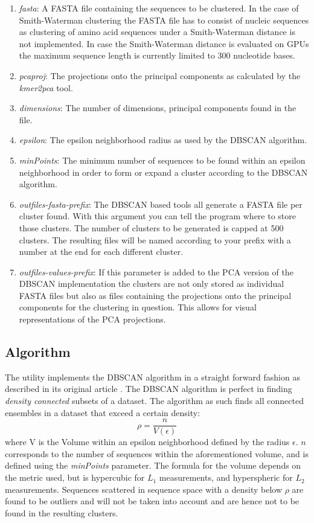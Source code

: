 \begin{enumerate}
  \item \emph{fasta}: A FASTA file containing the sequences to be
    clustered. In the case of Smith-Waterman clustering the FASTA file
    has to consist of nucleic sequences as clustering of amino acid
    sequences under a Smith-Waterman distance is not implemented. In
    case the Smith-Waterman distance is evaluated on GPUs the maximum
    sequence length is currently limited to 300 nucleotide bases.
  \item \emph{pcaproj}: The projections onto the principal components
    as calculated by the \emph{kmer2pca} tool. 
  \item \emph{dimensions}: The number of dimensions, principal
    components found in the file.
  \item \emph{epsilon}: The epsilon neighborhood radius as used by the DBSCAN
    \cite{dbscan} algorithm.
  \item \emph{minPoints}: The minimum number of sequences to be found
    within an epsilon neighborhood in order to form or expand a
    cluster according to the DBSCAN algorithm.
  \item \emph{outfiles-fasta-prefix}: The DBSCAN based tools all
    generate a FASTA file per cluster found. With this argument you
    can tell the program where to store those clusters. The number of
    clusters to be generated is capped at 500 clusters. The resulting
    files will be named according to your prefix with a number at the
    end for each different cluster.
  \item \emph{outfiles-values-prefix}: If this parameter is added to
    the PCA version of the DBSCAN implementation the clusters are not
    only stored as individual FASTA files but also as files containing
    the projections onto the principal components for the clustering
    in question. This allows for visual representations of the PCA projections.
\end{enumerate}

\subsection{Algorithm} \label{sec-dbscan-algorithm}

The utility implements the DBSCAN algorithm in a straight forward
fashion as
described in its original article \cite{dbscan}. The DBSCAN algorithm
is perfect in finding \emph{density connected} subsets of a
dataset. The algorithm as such finds all connected ensembles in a
dataset that exceed a certain density:
\begin{equation}
  \rho = \frac{n}{V(\epsilon)} \label{eqn-density}
\end{equation}
where V is the Volume within an epsilon neighborhood defined by the
radius $\epsilon$. $n$ corresponds to the number of sequences within
the aforementioned volume, and is defined using the \emph{minPoints}
parameter. The formula for the volume depends on the metric used, but
is hypercubic for $L_1$ measurements, and hyperspheric for $L_2$
measurements. Sequences scattered in sequence space with a density
below $\rho$ are found to be outliers and will not be taken into
account and are hence not to be found in the resulting clusters. 

